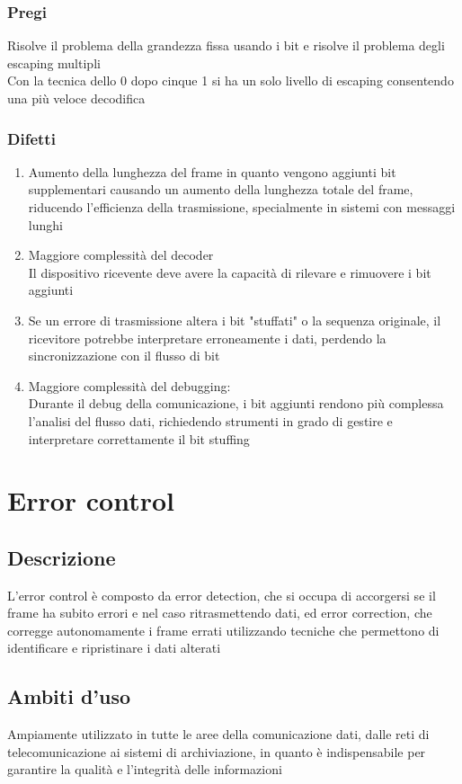 \documentclass[10pt,oneside,a4paper]{article}
\begin{document}
\subsubsection{Pregi}
Risolve il problema della grandezza fissa usando i bit e risolve il problema degli escaping multipli\\
Con la tecnica dello 0 dopo cinque 1 si ha un solo livello di escaping consentendo una più veloce decodifica
\subsubsection{Difetti}
\begin{enumerate}
\item Aumento della lunghezza del frame in quanto vengono aggiunti bit supplementari causando un aumento della lunghezza totale del frame, riducendo l'efficienza della trasmissione, specialmente in sistemi con messaggi lunghi
\item Maggiore complessità del decoder\\
Il dispositivo ricevente deve avere la capacità di rilevare e rimuovere i bit aggiunti
\item Se un errore di trasmissione altera i bit "stuffati" o la sequenza originale, il ricevitore potrebbe interpretare erroneamente i dati, perdendo la sincronizzazione con il flusso di bit
\item Maggiore complessità del debugging:\\
Durante il debug della comunicazione, i bit aggiunti rendono più complessa l'analisi del flusso dati, richiedendo strumenti in grado di gestire e interpretare correttamente il bit stuffing
\end{enumerate}
\section{Error control}
\subsection{Descrizione}
L'error control è composto da error detection, che si occupa di accorgersi se il frame ha subito errori e nel caso ritrasmettendo dati, ed error correction, che corregge autonomamente i frame errati utilizzando tecniche che permettono di identificare e ripristinare i dati alterati
\subsection{Ambiti d'uso}
Ampiamente utilizzato in tutte le aree della comunicazione dati, dalle reti di telecomunicazione ai sistemi di archiviazione, in quanto è indispensabile per garantire la qualità e l'integrità delle informazioni
\end{document}
